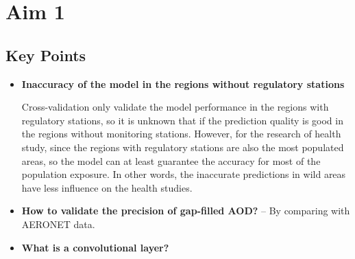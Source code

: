 \documentclass{article}
\begin{document}
\section{Aim 1}
\subsection{Key Points}
\begin{itemize}
    \item \textbf{Inaccuracy of the model in the regions without regulatory stations}{
    
    Cross-validation only validate the model performance in the regions with regulatory stations, so it is unknown that if the prediction quality is good in the regions without monitoring stations. However, for the research of health study, since the regions with regulatory stations are also the most populated areas, so the model can at least guarantee the accuracy for most of the population exposure. In other words, the inaccurate predictions in wild areas have less influence on the health studies. 
    }
    \item \textbf{How to validate the precision of gap-filled AOD?} -- By comparing with AERONET data.
    \item \textbf{What is a convolutional layer?} {
    
}
\end{itemize}
\end{document}
